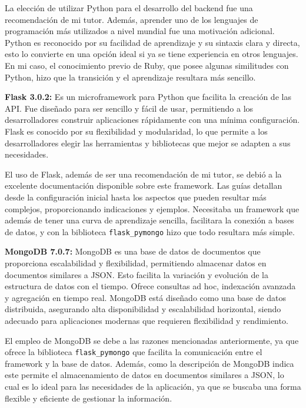 La elección de utilizar Python para el desarrollo del backend fue una recomendación de mi tutor. Además, aprender uno de los lenguajes de programación más utilizados a nivel mundial fue una motivación adicional. Python es reconocido por su facilidad de aprendizaje y su sintaxis clara y directa, esto lo convierte en una opción ideal si ya se tiene experiencia en otros lenguajes. En mi caso, el conocimiento previo de Ruby, que posee algunas similitudes con Python, hizo que la transición  y el aprendizaje resultara más sencillo.

\textbf{Flask 3.0.2:} Es un microframework para Python que facilita la creación de las API. Fue diseñado para ser sencillo y fácil de usar, permitiendo a los desarrolladores construir aplicaciones rápidamente con una mínima configuración. Flask es conocido por su flexibilidad y modularidad, lo que permite a los desarrolladores elegir las herramientas y bibliotecas que mejor se adapten a sus necesidades. \cite{python_basics}

El uso de Flask, además de ser una recomendación de mi tutor, se debió a la excelente documentación disponible sobre este framework. Las guías detallan desde la configuración inicial hasta los aspectos que pueden resultar más complejos, proporcionando indicaciones y ejemplos. Necesitaba un framework que además de tener una curva de aprendizaje sencilla, facilitara la conexión a bases de datos, y con la biblioteca \texttt{flask\_pymongo} hizo que todo resultara más simple.


\textbf{MongoDB 7.0.7:} MongoDB es una base de datos de documentos que proporciona escalabilidad y flexibilidad, permitiendo almacenar datos en documentos similares a JSON. Esto facilita la variación y evolución de la estructura de datos con el tiempo. Ofrece consultas ad hoc, indexación avanzada y agregación en tiempo real. MongoDB está diseñado como una base de datos distribuida, asegurando alta disponibilidad y escalabilidad horizontal, siendo adecuado para aplicaciones modernas que requieren flexibilidad y rendimiento. \cite{mongodb}

El empleo de MongoDB se debe a las razones mencionadas anteriormente, ya que ofrece la biblioteca \texttt{flask\_pymongo} que facilita la comunicación entre el framework y la base de datos. Además, como la descripción de MongoDB indica este permite el almacenamiento de datos en documentos similares a JSON, lo cual es lo ideal para las necesidades de la aplicación, ya que se buscaba una forma flexible y eficiente de gestionar la información. 

